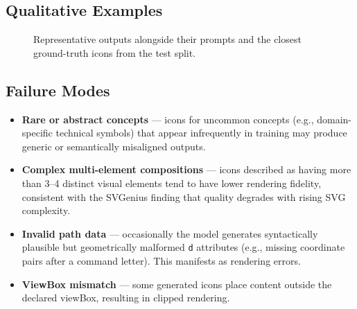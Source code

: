 
\subsection{Qualitative Examples}


\begin{figure}[h]
    \centering
    \caption{Representative \method{} outputs alongside their prompts
    and the closest ground-truth icons from the test split.}
    \label{fig:qualitative}
\end{figure}

\subsection{Failure Modes}


\begin{itemize}
    \item \textbf{Rare or abstract concepts} — icons for uncommon concepts
          (e.g., domain-specific technical symbols) that appear infrequently
          in training may produce generic or semantically misaligned outputs.

    \item \textbf{Complex multi-element compositions} — icons described as
          having more than 3--4 distinct visual elements tend to have lower
          rendering fidelity, consistent with the SVGenius finding that quality
          degrades with rising SVG complexity.

    \item \textbf{Invalid path data} — occasionally the model generates
          syntactically plausible but geometrically malformed \texttt{d}
          attributes (e.g., missing coordinate pairs after a command letter).
          This manifests as rendering errors. 

    \item \textbf{ViewBox mismatch} — some generated icons place content
          outside the declared viewBox, resulting in clipped rendering.
\end{itemize}

